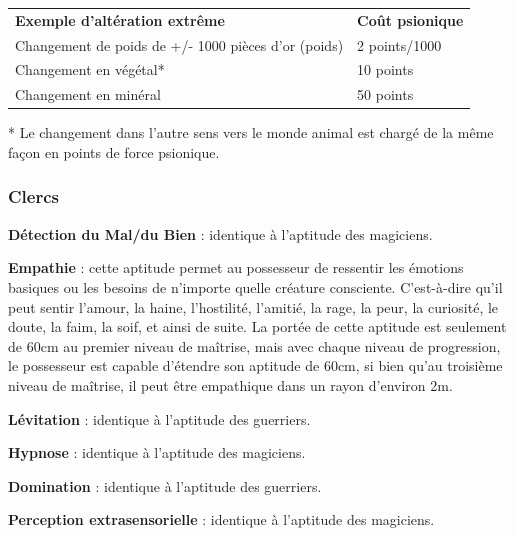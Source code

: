 \documentclass[11pt]{article}
\begin{document}
{\bigskip

\begin{tabular}{p{10cm}l}
\textbf{Exemple d'altération extrême} & \textbf{Coût psionique} \\
Changement de poids de +/- 1000 pièces d'or (poids) & 2 points/1000 \\
Changement en végétal* & 10 points \\
Changement en minéral & 50 points \\
\end{tabular}

\bigskip

* Le changement dans l'autre sens vers le monde animal est chargé de la même façon en points de force psionique.

\subsubsection*{Clercs}

\textbf{Détection du Mal/du Bien} : identique à l'aptitude des magiciens.

\bigskip

\textbf{Empathie} : cette aptitude permet au possesseur de ressentir les émotions basiques ou les besoins de n'importe quelle créature consciente. C'est-à-dire qu'il peut sentir l'amour, la haine, l'hostilité, l'amitié, la rage, la peur, la curiosité, le doute, la faim, la soif, et ainsi de suite. La portée de cette aptitude est seulement de 60cm au premier niveau de maîtrise, mais avec chaque niveau de progression, le possesseur est capable d'étendre son aptitude de 60cm, si bien qu'au troisième niveau de maîtrise, il peut être empathique dans un rayon d'environ 2m.

\bigskip

\textbf{Lévitation} : identique à l'aptitude des guerriers.

\bigskip

\textbf{Hypnose} : identique à l'aptitude des magiciens.

\bigskip

\textbf{Domination} : identique à l'aptitude des guerriers.

\bigskip

\textbf{Perception extrasensorielle} : identique à l'aptitude des magiciens.

\bigskip

}
\end{document}

